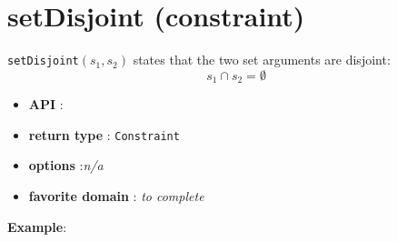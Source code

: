 \label{setdisjoint}
\hypertarget{setdisjoint}{}

\section{setDisjoint (constraint)}\label{setdisjoint:setdisjointconstraint}\hypertarget{setdisjoint:setdisjointconstraint}{}
\begin{notedef}
  \texttt{setDisjoint}$(s_1,s_2)$ states that the two set arguments are disjoint:
$$s_1\cap s_2=\emptyset$$
\end{notedef}

\begin{itemize}
	\item \textbf{API} : 
	\item \textbf{return type} : \texttt{Constraint}
	\item \textbf{options} :\emph{n/a}
	\item \textbf{favorite domain} : \emph{to complete}
\end{itemize}

\textbf{Example}:


